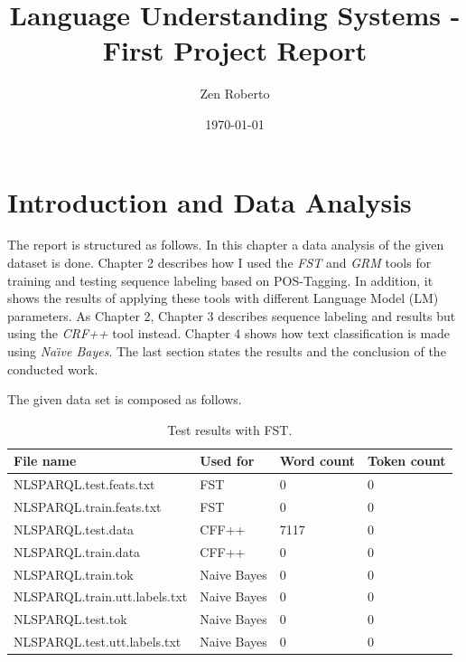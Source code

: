 \documentclass[a4paper,7pt,oneside]{book}
\author{Zen Roberto}
\title{Language Understanding Systems - First Project Report}
\date{\today}
\begin{document}





\chapter{Introduction and Data Analysis}

The report is structured as follows. In this chapter a data analysis of the given dataset is done. Chapter 2 describes how I used the \textit{FST} and \textit{GRM} tools for training and testing sequence labeling based on POS-Tagging. In addition, it shows the results of applying these tools with different Language Model (LM) parameters. As Chapter 2, Chapter 3 describes sequence labeling and results but using the \textit{CRF++} tool instead. Chapter 4 shows how text classification is made using \textit{Na\"{\i}ve Bayes}. The last section states the results and the conclusion of the conducted work.

The given data set is composed as follows.

\begin{table}[h!]
\small
	\begin{center}
	\begin{tabular}{|l|l|l|l|}
		\hline
		File name & Used for & Word count & Token count \\ \hline

		NLSPARQL.test.feats.txt	& FST & 0 & 0 \\ \hline
		NLSPARQL.train.feats.txt & FST & 0 & 0 \\ \hline
		
		NLSPARQL.test.data	& CFF++ & 7117 & 0 \\ \hline
		NLSPARQL.train.data	& CFF++ & 0 & 0 \\ \hline
		
		NLSPARQL.train.tok	& Naive Bayes & 0 & 0 \\ \hline
		NLSPARQL.train.utt.labels.txt & Naive Bayes & 0 & 0 \\ \hline
		NLSPARQL.test.tok	& Naive Bayes & 0 & 0 \\ \hline
		NLSPARQL.test.utt.labels.txt & Naive Bayes & 0 & 0 \\ \hline
		
	\end{tabular}
	\caption{Test results with FST.}
	\label{table:fst_results}
	\end{center}
\end{table}
\end{document}
